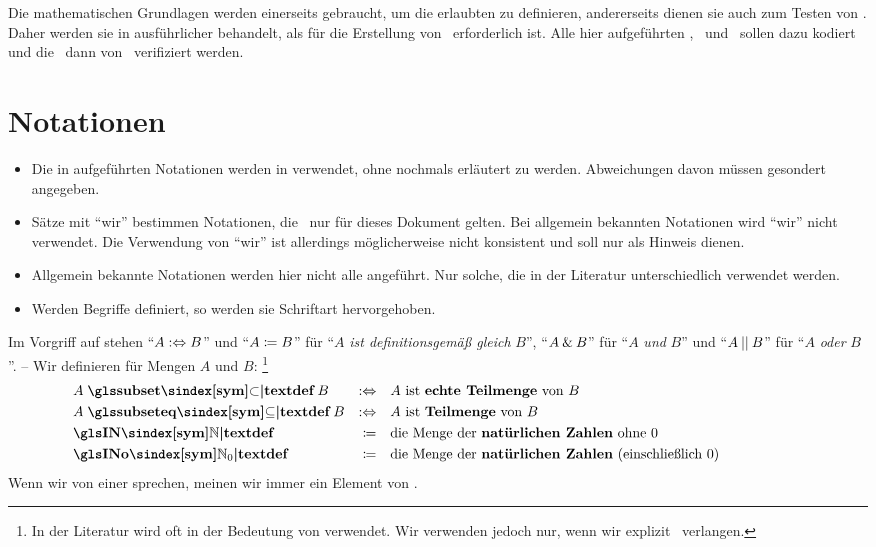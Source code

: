 Die mathematischen Grundlagen werden einerseits gebraucht, um die erlaubten \Beweisschritte{} zu definieren, andererseits dienen sie auch zum Testen von \ASBA.
Daher werden sie in  ausführlicher behandelt, als für die Erstellung von \ASBA\ erforderlich ist.
Alle hier aufgeführten \Axiome, \Saetze\ und \Beweise\ sollen dazu kodiert und die \Beweise\ dann von \ASBA\ verifiziert werden.

\section{Notationen}%
\label{sec:Notationen}

\begin{itemize}
	\item Die in  aufgeführten Notationen werden in  verwendet, ohne nochmals erläutert zu werden. Abweichungen davon müssen gesondert angegeben.
	\item Sätze mit \enquote{wir} bestimmen Notationen, die \textevtl\ nur für dieses Dokument gelten.
	Bei allgemein bekannten Notationen wird \enquote{wir} nicht verwendet.
	Die Verwendung von \enquote{wir} ist allerdings möglicherweise nicht konsistent und soll nur als Hinweis dienen.
	\item Allgemein bekannte Notationen werden hier nicht alle angeführt.
	Nur solche, die in der Literatur unterschiedlich verwendet werden.
	\item Werden Begriffe definiert, so werden sie  Schriftart hervorgehoben.
\end{itemize}
%
Im Vorgriff auf  stehen \enquote{$A :\Leftrightarrow B$} und \enquote{$A \coloneqq B$} für \enquote{$A$ \emph{ist definitionsgemäß gleich} $B$}, \enquote{$A \mathbin{\&} B$} für \enquote{$A$ \emph{und} $B$} und \enquote{$A \mathbin{||} B$} für \enquote{$A$ \emph{oder} $B$}.
-- Wir definieren für Mengen $A$ und $B$:%
\footnote{%
	In der Literatur wird \chrqt{\symsubset} oft in der Bedeutung von \chrqt{\symsubseteq} verwendet.
	Wir verwenden \chrqt{\symsubset} jedoch nur, wenn wir explizit \Ungleichheit\ verlangen.
}
%
\begin{align}
	& A \opdefinition{\symsubset}   B & \metadefeq \quad &
	\text{$A$ ist \defn{echte Teilmenge} von $B$}
	\label{def:subset}\\
	& A \opdefinition{\symsubseteq} B & \metadefeq \quad &
	\text{$A$ ist       \defn{Teilmenge} von $B$}
	\label{def:subseteq}\\
	&     \definition{\symIN}         &     \defeq \quad &
	\text{die Menge der \defn{natürlichen Zahlen}  ohne           $0$}
	\label{def:IN}\\
	&     \definition{\symINo}        &     \defeq \quad &
	\text{die Menge der \defn{natürlichen Zahlen} (einschließlich $0$)}
	\label{def:INo}
	\formulatoleft
\end{align}
Wenn wir von einer  sprechen, meinen wir immer ein Element von \symINo.

